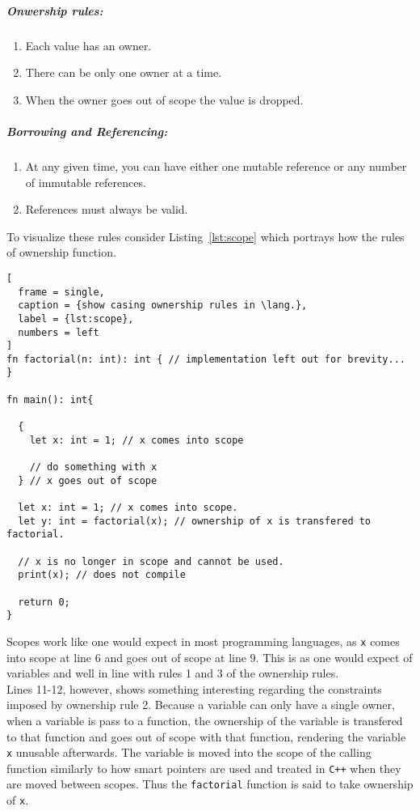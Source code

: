 \subparagraph{Onwership rules:}
\begin{enumerate}
  \item Each value has an owner. 
  \item There can be only one owner at a time. 
  \item When the owner goes out of scope the value is dropped.
\end{enumerate}

\subparagraph{Borrowing and Referencing:}
\label{par:borrowing}

\begin{enumerate}
  \item At any given time, you can have either one mutable reference or any number of
    immutable references.
  \item References must always be valid.
\end{enumerate}

To visualize these rules consider Listing~\ref{lst:scope} which portrays how the
rules of ownership function.

\begin{lstlisting}[
  frame = single,
  caption = {show casing ownership rules in \lang.},
  label = {lst:scope},
  numbers = left
]
fn factorial(n: int): int { // implementation left out for brevity... }

fn main(): int{
  
  {
    let x: int = 1; // x comes into scope

    // do something with x
  } // x goes out of scope

  let x: int = 1; // x comes into scope.
  let y: int = factorial(x); // ownership of x is transfered to factorial.

  // x is no longer in scope and cannot be used.
  print(x); // does not compile

  return 0;
}
\end{lstlisting}

Scopes work like one would expect in most programming languages, as \texttt{x} comes into
scope at line 6 and goes out of scope at line 9. This is as one would expect of
variables and well in line with rules 1 and 3 of the ownership
rules. \\

Lines 11-12, however, shows something interesting regarding the constraints imposed
by ownership rule 2. Because a variable can only have a single owner, when a variable
is pass to a function, the ownership of the variable is transfered to that function
and goes out of scope with that function, rendering the variable
\texttt{x} unusable afterwards. The variable is moved into the scope of the calling
function similarly to how smart pointers are used and treated in
\texttt{C++} when they are moved between scopes\cite{CPPRef}. Thus the
\texttt{factorial} function is said to take ownership of \texttt{x}.

